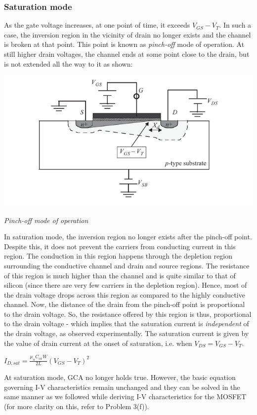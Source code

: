 \documentclass[12 pt]{article}
\begin{document}
\subsubsection{Saturation mode}
As the gate voltage increases, at one point of time, it exceeds $V_{GS}-V_{T}$. In such a case, the inversion region in the vicinity of drain no longer exists and the channel is broken at that point. This point is known as \emph{pinch-off} mode of operation. At still higher drain voltages, the channel ends at some point close to the drain, but is not extended all the way to it as shown: \newline

\par
\begin{center}
    \includegraphics{MOSFET_3.png}
\end{center}
\begin{center}
    \emph{\hspace{2.5 cm}Pinch-off mode of operation\newline}
\end{center}
\par

In saturation mode, the inversion region no longer exists after the pinch-off point. Despite this, it does not prevent the carriers from conducting current in this region. The conduction in this region happens through the depletion region surrounding the conductive channel and drain and source regions. The resistance of this region is much higher than the channel and is quite similar to that of silicon (since there are very few carriers in the depletion region). Hence, most of the drain voltage drops across this region as compared to the highly conductive channel. Now, the distance of the drain from the pinch-off point is proportional to the drain voltage. So, the resistance offered by this region is thus, proportional to the drain voltage - which implies that the saturation current is \emph{independent} of the drain voltage, as observed experimentally. The saturation current is given by the value of drain current at the onset of saturation, i.e. when $V_{DS} = V_{GS}-V_{T}$. 
\begin{center}
    $I_{D,sat} = \frac{\mu_{n}C_{ox}W}{2L}(V_{GS}-V_{T})^{2}$
\end{center}
At saturation mode, GCA no longer holds true. However, the basic equation governing I-V characteristics remain unchanged and they can be solved in the same manner as we followed while deriving I-V characteristics for the MOSFET (for more clarity on this, refer to Problem 3(f)).  \par
\end{document}
